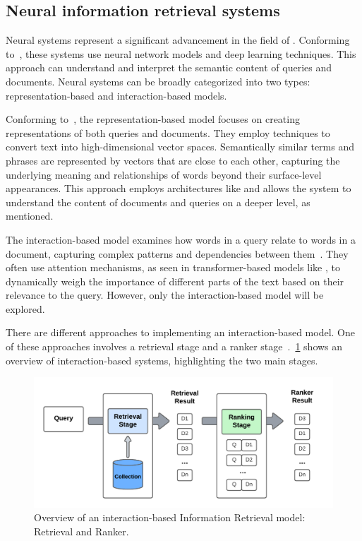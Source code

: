 \subsection{Neural information retrieval systems}

Neural {\ir} systems represent a significant advancement in the field of {\ir}. Conforming to~\citet{mitra_introduction_nodate}, these systems use neural network models and deep learning techniques. This approach can understand and interpret the semantic content of queries and documents. Neural {\ir} systems can be broadly categorized into two types: representation-based and interaction-based models.

Conforming to~\citet{chen_integrating_2023}, the representation-based model focuses on creating representations of both queries and documents. They employ techniques to convert text into high-dimensional vector spaces. Semantically similar terms and phrases are represented by vectors that are close to each other, capturing the underlying meaning and relationships of words beyond their surface-level appearances. This approach employs architectures like {\rnn} and allows the system to understand the content of documents and queries on a deeper level, as~\citet{liu_deep_2022} mentioned.

The interaction-based model examines how words in a query relate to words in a document, capturing complex patterns and dependencies between them~\cite{chen_integrating_2023}. They often use attention mechanisms, as seen in transformer-based models like {\bert}, to dynamically weigh the importance of different parts of the text based on their relevance to the query. However, only the interaction-based model will be explored.

There are different approaches to implementing an interaction-based model. One of these approaches involves a retrieval stage and a ranker stage~\cite{mitra_introduction_nodate}.~\ref{fig_ir_system} shows an overview of interaction-based {\ir} systems, highlighting the two main stages.

\begin{figure}[ht]
    \includegraphics[width=\textwidth]{figs/chapter2/IR_system.png}
    \centering
    \caption[Overview of an interaction-based Information Retrieval model]{Overview of an interaction-based Information Retrieval model: Retrieval and Ranker.}
    \label{fig_ir_system}
\end{figure}

